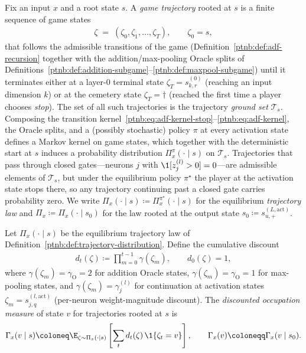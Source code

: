 \begin{definition}\label{ptnb:def:trajectory-distribution}
Fix an input $x$ and a root state $s$. A \emph{game trajectory} rooted at $s$ is a finite sequence
of game states
\begin{align}
    \zeta \;=\; (\zeta_0, \zeta_1, \dots, \zeta_T), \qquad \zeta_0 = s,
\end{align}
that follows the admissible transitions of the game (Definition~\ref{ptnb:def:adf-recursion} together
with the addition/max-pooling Oracle splits of
Definitions~\ref{ptnb:def:addition-subgame}--\ref{ptnb:def:maxpool-subgame}) until it terminates either at a
layer-$0$ terminal state $\zeta_T = s_{k,r}^{(0)}$ (reaching an input dimension $k$) or at the
cemetery state $\zeta_T = \dagger$ (reached the first time a player chooses \emph{stop}). The set
of all such trajectories is the trajectory \emph{ground set} $\mathcal{T}_s$. Composing the
transition kernel~\eqref{ptnb:eq:adf-kernel-stop}--\eqref{ptnb:eq:adf-kernel}, the Oracle splits, and a
(possibly stochastic) policy $\pi$ at every activation state defines a Markov kernel on game
states, which together with the deterministic start at $s$ induces a probability distribution
$\Pi_x^\pi(\cdot \mid s)$ on $\mathcal{T}_s$. Trajectories that pass through closed gates---neurons
$j$ with $\1[z_j^{(l)} > 0] = 0$---are admissible elements of $\mathcal{T}_s$, but under the
equilibrium policy $\pi^\star$ the player at the activation state stops there, so any trajectory
continuing past a closed gate carries probability zero. We write $\Pi_x(\cdot \mid s) \coloneqq
    \Pi_x^{\pi^\star}(\cdot \mid s)$ for the equilibrium \emph{trajectory law} and $\Pi_x \coloneqq
    \Pi_x(\cdot \mid s_0)$ for the law rooted at the output state $s_0 \coloneqq
    s_{u,+}^{(L,\mathrm{act})}$.
\end{definition}

\begin{definition}\label{ptnb:def:occupation}
Let $\Pi_x(\cdot \mid s)$ be the equilibrium trajectory law of
Definition~\ref{ptnb:def:trajectory-distribution}.
Define the cumulative discount
\begin{align}
    d_t(\zeta) \coloneqq \prod_{m=0}^{t-1} \gamma(\zeta_m), \qquad d_0(\zeta) = 1,
\end{align}
where $\gamma(\zeta_m) = \gamma_{\mathrm{O}} = 2$ for addition Oracle states, $\gamma(\zeta_m) =
    \gamma_{\mathrm{O}} = 1$ for max-pooling states, and $\gamma(\zeta_m) = \gamma_j^{(l)}$ for
continuation at activation states $\zeta_m = s_{j,q}^{(l,\mathrm{act})}$ (per-neuron
weight-magnitude discount). The \emph{discounted occupation measure} of state $v$ for trajectories
rooted at $s$ is
\begin{align}
    \Gamma_x(v \mid s) \coloneq \E_{\zeta \sim \Pi_x(\cdot \mid s)}\left[\sum_t d_t(\zeta)\,\1\{\zeta_t
    = v\}\right],
    \qquad
    \Gamma_x(v) \coloneqq \Gamma_x(v \mid s_0).
\end{align}
\end{definition}


